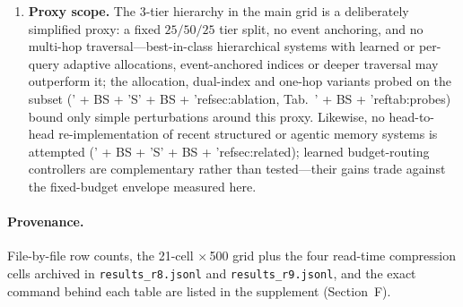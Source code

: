 \documentclass{article} %
\begin{document}
\begin{enumerate}
answer gain). Retrieval operates at turn granularity with whitespace tokenization; temporal
query expansion, sentence/entity-level indexing, and full graph traversal remain untested---
the one-hop traversal we did test degraded accuracy. Read-time digest selection likewise
ranks digests with plain BM25---dense or learned digest indexing is untested, though the
retriever-family ablation bounds the analogous gains on turns. Turn-level gold
identification rests on audit sampling rather than exhaustive annotation, so the
turn-selection bottleneck is bounded, not exactly measured.
\item \textbf{Proxy scope.} The 3-tier hierarchy in the main grid is a deliberately simplified
proxy: a fixed $25/50/25$ tier split, no event anchoring, and no multi-hop traversal---best-in-class
hierarchical systems with learned or per-query adaptive allocations, event-anchored indices or
deeper traversal may outperform it; the allocation, dual-index and one-hop variants probed on
the subset (' + BS + 'S' + BS + 'ref{sec:ablation}, Tab.~' + BS + 'ref{tab:probes}) bound only simple perturbations around
this proxy. Likewise, no head-to-head re-implementation of recent structured or agentic memory
systems is attempted (' + BS + 'S' + BS + 'ref{sec:related}); learned budget-routing controllers are complementary
rather than tested---their gains trade against the fixed-budget envelope measured here.
\end{enumerate}

\paragraph{Provenance.} File-by-file row counts, the 21-cell $\times$\,500 grid plus the four
read-time compression cells archived in \texttt{results\_r8.jsonl} and \texttt{results\_r9.jsonl},
and the exact command behind each table are listed in the supplement (Section~F).
\end{document}
